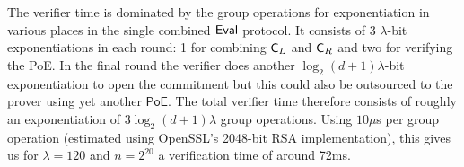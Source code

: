 The verifier time is dominated by the group operations for exponentiation in various places in the single combined $\textsf{{Eval}}$ protocol. It consists of 3 $\lambda$-bit exponentiations in each round: 1 for combining $\mathsf{C}_L$ and $\mathsf{C}_R$ and two for verifying the \textsf{PoE}. In the final round the verifier does another $\log_2(d+1)\lambda$-bit exponentiation to open the commitment but this could also be outsourced to the prover using yet another $\textsf{PoE}$. The total verifier time therefore consists of roughly an exponentiation of $3 \log_2(d+1) \lambda$ group operations. 
Using $10\mu$s per group operation (estimated using OpenSSL's 2048-bit RSA implementation), this gives us for $\lambda=120$ and $n=2^{20}$ a verification time of around 72ms. 
